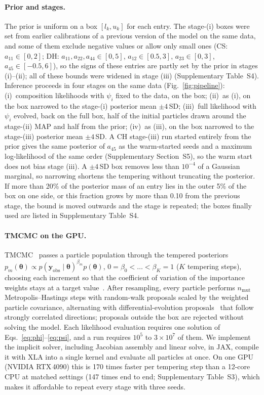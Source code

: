 \documentclass[preprint,12pt]{elsarticle}
\newcommand{\btheta}{\boldsymbol{\theta}}
\newcommand{\yobs}{\mathbf{y}_{\mathrm{obs}}}
\begin{document}
\paragraph{Prior and stages.}
The prior is uniform on a box $[l_k,u_k]$ for each entry.
The stage-(i) boxes were set from earlier calibrations of a previous version of the model on the same data, and some of them exclude negative values or allow only small ones (CS: $a_{11}\in[0,2]$; DH: $a_{11},a_{22},a_{44}\in[0,5]$, $a_{12}\in[0.5,3]$, $a_{23}\in[0,3]$, $a_{45}\in[-0.5,6]$), so the signs of these entries are partly set by the prior in stages (i)--(ii); all of these bounds were widened in stage (iii) (Supplementary Table~S4).
Inference proceeds in four stages on the same data (Fig.~\ref{fig:pipeline}):
(i)~composition likelihoods with $\psi_i$ fixed to the data, on the box;
(ii)~as (i), on the box narrowed to the stage-(i) posterior mean $\pm4$\,SD;
(iii)~full likelihood with $\psi_i$ evolved, back on the full box, half of the initial particles drawn around the stage-(ii) MAP and half from the prior;
(iv)~as (iii), on the box narrowed to the stage-(iii) posterior mean $\pm4$\,SD.
A CH stage-(iii) run started entirely from the prior gives the same posterior of $a_{45}$ as the warm-started seeds and a maximum log-likelihood of the same order (Supplementary Section~S5), so the warm start does not bias stage (iii).
A $\pm4$\,SD box removes less than $10^{-4}$ of a Gaussian marginal, so narrowing shortens the tempering without truncating the posterior.
If more than 20\% of the posterior mass of an entry lies in the outer 5\% of the box on one side, or this fraction grows by more than 0.10 from the previous stage, the bound is moved outwards and the stage is repeated; the boxes finally used are listed in Supplementary Table~S4.

\paragraph{TMCMC on the GPU.}
TMCMC~\citep{ChingChen2007TMCMC, DelMoral2006SMC} passes a particle population through the tempered posteriors $p_m(\btheta)\propto p(\yobs\mid\btheta)^{\beta_m}p(\btheta)$, $0=\beta_0<\dots<\beta_K=1$ ($K$ tempering steps), choosing each increment so that the coefficient of variation of the importance weights stays at a target value~\citep{Betz2016TMCMC}.
After resampling, every particle performs $n_{\mathrm{mut}}$ Metropolis--Hastings steps with random-walk proposals scaled by the weighted particle covariance, alternating with differential-evolution proposals~\citep{terBraak2006DEMC} that follow strongly correlated directions; proposals outside the box are rejected without solving the model.
Each likelihood evaluation requires one solution of Eqs.~\eqref{eq:phi}--\eqref{eq:psi}, and a run requires $10^5$ to $3\times10^7$ of them.
We implement the implicit solver, including Jacobian assembly and linear solve, in JAX, compile it with XLA into a single kernel and evaluate all particles at once.
On one GPU (NVIDIA RTX\,4090) this is 170 times faster per tempering step than a 12-core CPU at matched settings (147 times end to end; Supplementary Table~S3), which makes it affordable to repeat every stage with three seeds.
\end{document}
